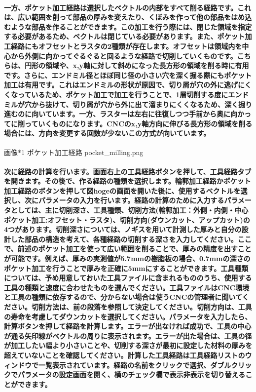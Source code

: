 \documentclass[b5paper, 9pt, twocolumn, titlepage,openany]{jsbook}%
\begin{document}
\paragraph{一方、ポケット加工経路は選択したベクトルの内部をすべて削る経路です。これは、広い範囲を削って部品の厚みを変えたり、くぼみを作って他の部品をはめ込むような部品を作ることができます。この加工を行う際には、閉じた領域を指定する必要があるため、ベクトルは閉じている必要があります。また、ポケット加工経路にもオフセットとラスタの2種類が存在します。オフセットは領域内を中心から外側に向かってぐるぐると回るような経路で切削していくものです。こちらは、円形の領域や、x,y軸に対して斜めになった長方形の領域を削る時に有用です。さらに、エンドミル径とほぼ同じ径の小さい穴を深く掘る際にもポケット加工は有用です。これはエンドミルの形状が原因で、切り屑が穴の外に逃げにくくなっているため、ポケット加工で加工を行うことで、1層切削する度にエンドミルが穴から抜けて、切り屑が穴から外に出て溜まりにくくなるため、深く掘り進むのに向いています。一方、ラスターは左右に往復しつつ手前から奥に向かってに削っていくものになります。CNCのx,y軸方向に伸びる長方形の領域を削る場合には、方向を変更する回数が少ないこの方式が向いています。}

画像*1 ポケット加工経路 pocket_milling.png

\paragraph{次に経路の計算を行います。画面右上の工具経路ボタンを押して、工具経路タブを開きます。その後で、作る経路の種類を選択します。輪郭加工経路かポケット加工経路のボタンを押して図hogeの画面を開いた後に、使用するベクトルを選択し、次にパラメータの入力を行います。経路の計算のために入力するパラメータとしては、主に切削深さ、工具種類、切削方法(輪郭加工：外側・内側・中心 ポケット加工:オフセット・ラスタ)、切削方向(ダウンカット、アップカット)の4つがあります。切削深さについては、ノギスを用いて計測した厚みと自分の設計した部品の構造を考えて、各種経路の切削する深さを入力してください。ここで、前述のポケット加工を使って広い範囲を削ることで、厚みの精度を出すことが可能です。例えば、厚みの実測値が5.7mmの樹脂板の場合、0.7mmの深さのポケット加工を行うことで厚みを正確に5mmにすることができます。工具種類については、予め用意しておいた工具ファイルに含まれるもののうち、使用する工具の種類と速度に合わせたものを選んでください。工具ファイルはCNC環境と工具の種類に依存するので、分からない場合は使うCNCの管理者に聞いてください。切削方法は、前の段落を参照して決定してください。切削方向は、工具の寿命を考慮してダウンカットを選択してください。パラメータを入力したら、計算ボタンを押して経路を計算します。エラーが出なければ成功で、工具の中心が通る矢印線がベクトルの周りに表示されます。エラーが出た場合は、工具の径が加工したい幅より小さいことや、切削する深さが最初に設定した材料の厚みを超えていないことを確認してください。計算した工具経路は工具経路リストのウィンドウで一覧表示されています。経路の名前をクリックで選択、ダブルクリックでパラメータの設定画面を開く、横のチェック欄で表示非表示を切り替えることができます。}
\end{document}
